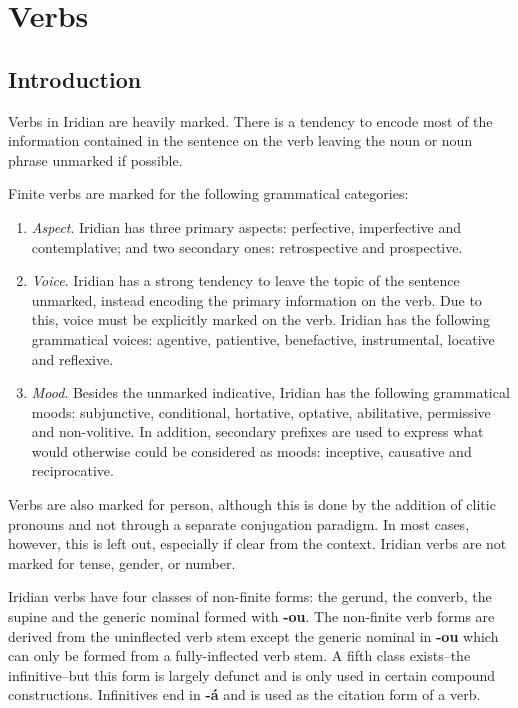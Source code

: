 \chapter{Verbs}
\section{Introduction}
Verbs in Iridian are heavily marked. There is a tendency to encode most of the information contained in the sentence on the verb leaving the noun or noun phrase unmarked if possible.

\par Finite verbs are marked for the following grammatical categories:
\begin{enumerate}
	\item \textit{Aspect}. Iridian has three primary aspects: perfective, imperfective and contemplative; and two secondary ones: retrospective and prospective.
	\item \textit{Voice}. Iridian has a strong tendency to leave the topic of the sentence unmarked, instead encoding the primary information on the verb. Due to this, voice must be explicitly marked on the verb. Iridian has the following grammatical voices: agentive, patientive, benefactive, instrumental, locative and reflexive.
	\item \textit{Mood}. Besides the unmarked indicative, Iridian has the following grammatical moods: subjunctive, conditional, hortative, optative, abilitative, permissive and non-volitive. In addition, secondary prefixes are used to express what would otherwise could be considered as moods: inceptive, causative and reciprocative.
\end{enumerate}

Verbs are also marked for person, although this is done by the addition of clitic pronouns and not through a separate conjugation paradigm. In most cases, however, this is left out, especially if clear from the context. Iridian verbs are not marked for tense, gender, or number.

\par Iridian verbs have four classes of non-finite forms: the gerund, the converb, the supine and the generic nominal formed with \textbf{-ou}. The non-finite verb forms are derived from the uninflected verb stem except the generic nominal in \textbf{-ou} which can only be formed from a fully-inflected verb stem. A fifth class exists--the infinitive--but this form is largely defunct and is only used in certain compound constructions. Infinitives end in \textbf{-á} and is used as the citation form of a verb.

